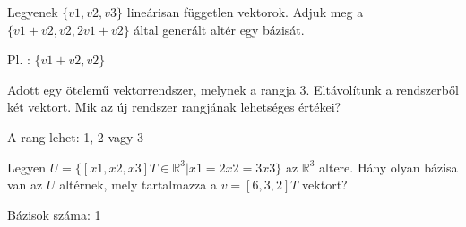 \begin{frame}
  \begin{tcolorbox}[title={3/9. -N-}]
     Legyenek $\{v1,v2,v3\}$ lineárisan független vektorok. Adjuk meg a $\{v1 + v2,v2,2v1 + v2\}$ által generált altér egy bázisát.

  \tcblower

    \mmedskip 
  
     Pl. : $\{v1 + v2,v2\}$
  \end{tcolorbox}
\end{frame}


\begin{frame}
  \begin{tcolorbox}[title={3/10. -Q-}]
     Adott egy ötelemű vektorrendszer, melynek a rangja $3.$ Eltávolítunk a rendszerből két vektort. Mik az új rendszer rangjának lehetséges értékei?
  \tcblower

    \mmedskip 
  
     A rang lehet: 1, 2 vagy 3

  \end{tcolorbox}
\end{frame}


\begin{frame}
  \begin{tcolorbox}[title={3/11. -Q-}]
     Legyen $U = \{[x1,x2,x3]T \in \mathbb{R}^3|x1 = 2x2 = 3x3\}$ az $\mathbb{R}^3$ altere. Hány olyan bázisa van az $U$ altérnek, mely tartalmazza a $v = [6,3,2]T$ vektort?
  \tcblower

    \mmedskip 
    Bázisok száma: 1
  \end{tcolorbox}
\end{frame}



